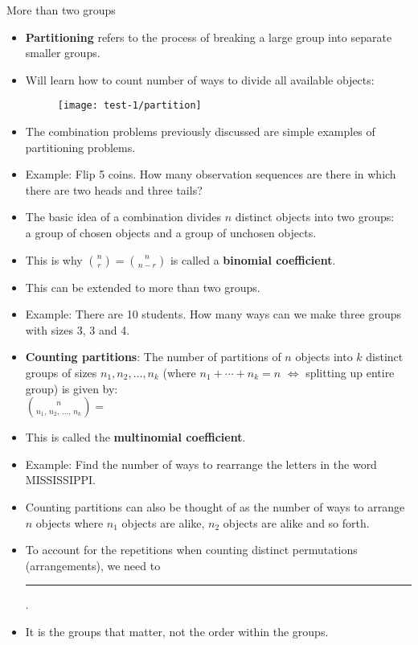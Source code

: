 \documentclass{article}
\newcommand{\blankul}[1]{\rule[-1.5mm]{#1}{0.15mm}}	%
\begin{document}
More than two groups\bigskip
\begin{itemize}
    \item \textbf{Partitioning} refers to the process of breaking a large group into separate smaller groups.
    \item[] Will learn how to count number of ways to divide all available objects:
    \begin{figure}[H]
        \center\texttt{[image: test-1/partition]}
    \end{figure}
    \item[] The combination problems previously discussed are simple examples of partitioning problems.
    \item Example: Flip 5 coins. How many observation sequences are there in which there are two heads and three tails?\vspace{50pt}
    \item The basic idea of a combination divides $n$ distinct objects into two groups:\\ a group of chosen objects and a group of unchosen objects.\bigskip
    \item[] This is why \hspace{10pt} $\displaystyle {n \choose r} =  {n \choose {n - r}}$\hspace{10pt} is called a \textbf{binomial coefficient}.
    \item This can be extended to more than two groups.
    \item[] Example: There are 10 students. How many ways can we make three groups with sizes 3, 3 and 4.\vspace{40pt}
    \item \textbf{Counting partitions}: The number of partitions of $n$ objects into $k$ distinct groups of sizes $n_1, n_2, \ldots, n_k$ (where $n_1 + \cdots + n_k = n$ $\Longleftrightarrow$ splitting up entire group) is given by:\bigskip\\
    $\displaystyle {n \choose {n_1,\, n_2,\, \ldots,\, n_k}} = $\vspace{20pt}
   \item[] This is called the \textbf{multinomial coefficient}.
   \newpage
   \item Example: Find the number of ways to rearrange the letters in the word MISSISSIPPI.\vspace{60pt}
   \item Counting partitions can also be thought of as the number of ways to arrange $n$ objects where $n_1$ objects are alike, $n_2$ objects are alike and so forth.
   \item[] To account for the repetitions when counting distinct permutations (arrangements), we need to \blankul{7cm}.
   \item[] It is the groups that matter, not the order within the groups.
\end{itemize}\bigskip
\end{document}
